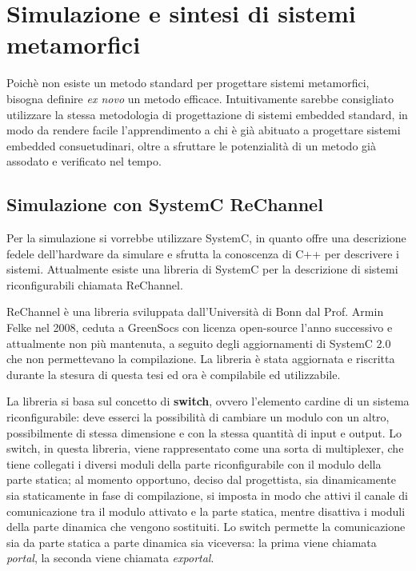 \documentclass[11pt]{article} %
\begin{document}
\section{Simulazione e sintesi di sistemi metamorfici}

Poichè non esiste un metodo standard per progettare sistemi metamorfici, bisogna definire \textit{ex novo} un metodo efficace. Intuitivamente sarebbe consigliato utilizzare la stessa metodologia di progettazione di sistemi embedded standard, in modo da rendere facile l'apprendimento a chi è già abituato a progettare sistemi embedded consuetudinari, oltre a sfruttare le potenzialità di un metodo già assodato e verificato nel tempo.

\subsection{Simulazione con SystemC ReChannel}

Per la simulazione si vorrebbe utilizzare SystemC, in quanto offre una descrizione fedele dell'hardware da simulare e sfrutta la conoscenza di C++ per descrivere i sistemi. Attualmente esiste una libreria di SystemC per la descrizione di sistemi riconfigurabili chiamata ReChannel.

ReChannel è una libreria sviluppata dall'Università di Bonn dal Prof. Armin Felke nel 2008, ceduta a GreenSocs con licenza open-source l'anno successivo e attualmente non più mantenuta, a seguito degli aggiornamenti di SystemC 2.0 che non permettevano la compilazione. La libreria è stata aggiornata e riscritta durante la stesura di questa tesi ed ora è compilabile ed utilizzabile.

La libreria si basa sul concetto di \textbf{switch}, ovvero l'elemento cardine di un sistema riconfigurabile: deve esserci la possibilità di cambiare un modulo con un altro, possibilmente di stessa dimensione e con la stessa quantità di input e output. Lo switch, in questa libreria, viene rappresentato come una sorta di multiplexer, che tiene collegati i diversi moduli della parte riconfigurabile con il modulo della parte statica; al momento opportuno, deciso dal progettista, sia dinamicamente sia staticamente in fase di compilazione, si imposta in modo che attivi il canale di comunicazione tra il modulo attivato e la parte statica, mentre disattiva i moduli della parte dinamica che vengono sostituiti. Lo switch permette la comunicazione sia da parte statica a parte dinamica sia viceversa: la prima viene chiamata \textit{portal}, la seconda viene chiamata \textit{exportal}.
\end{document}
